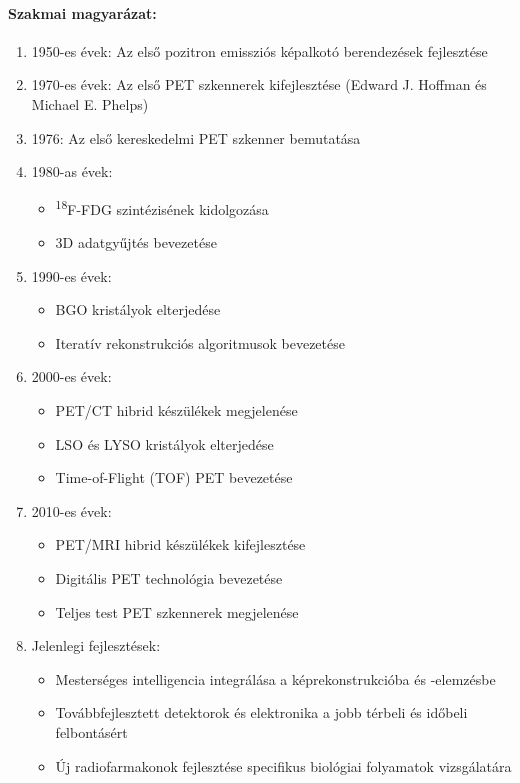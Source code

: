 \documentclass[a4paper,12pt]{article}
\begin{document}
\paragraph{Szakmai magyarázat:} \begin{enumerate} \item 1950-es évek: Az első pozitron emissziós képalkotó berendezések fejlesztése

\item 1970-es évek: Az első PET szkennerek kifejlesztése (Edward J. Hoffman és Michael E. Phelps) \item 1976: Az első kereskedelmi PET szkenner bemutatása \item 1980-as évek: \begin{itemize} \item \textsuperscript{18}F-FDG szintézisének kidolgozása \item 3D adatgyűjtés bevezetése \end{itemize} \item 1990-es évek: \begin{itemize} \item BGO kristályok elterjedése \item Iteratív rekonstrukciós algoritmusok bevezetése \end{itemize} \item 2000-es évek: \begin{itemize} \item PET/CT hibrid készülékek megjelenése \item LSO és LYSO kristályok elterjedése \item Time-of-Flight (TOF) PET bevezetése \end{itemize} \item 2010-es évek: \begin{itemize} \item PET/MRI hibrid készülékek kifejlesztése \item Digitális PET technológia bevezetése \item Teljes test PET szkennerek megjelenése \end{itemize} \item Jelenlegi fejlesztések: \begin{itemize} \item Mesterséges intelligencia integrálása a képrekonstrukcióba és -elemzésbe \item Továbbfejlesztett detektorok és elektronika a jobb térbeli és időbeli felbontásért \item Új radiofarmakonok fejlesztése specifikus biológiai folyamatok vizsgálatára \end{itemize}
\end{enumerate}
\end{document}
